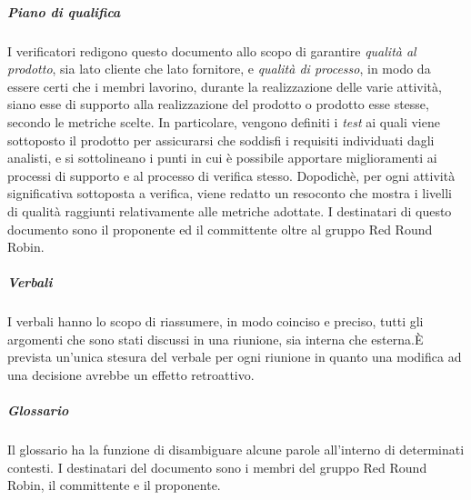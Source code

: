 				\subparagraph{Piano di qualifica}
		 			I verificatori redigono questo documento allo scopo di garantire \textit{qualità al prodotto}, sia lato cliente che lato fornitore, e \textit{qualità di processo}, in modo da essere certi che i membri lavorino, durante la realizzazione delle varie attività, siano esse di supporto alla realizzazione del prodotto o prodotto esse stesse, secondo le metriche scelte. In particolare, vengono definiti i \textit{test} ai quali viene sottoposto il prodotto per assicurarsi che soddisfi i requisiti individuati dagli analisti, e si sottolineano i punti in cui è possibile apportare miglioramenti ai processi di supporto e al processo di verifica stesso. Dopodichè, per ogni attività significativa sottoposta a verifica, viene redatto un resoconto che mostra i livelli di qualità raggiunti relativamente alle metriche adottate. I destinatari di questo documento sono il proponente ed il committente oltre al gruppo Red Round Robin.	
				\subparagraph{Verbali}
					I verbali hanno lo scopo di riassumere, in modo coinciso e preciso, tutti gli argomenti che sono stati discussi in una riunione, sia interna che esterna.È prevista un'unica stesura del verbale per ogni riunione in quanto una modifica ad una decisione avrebbe un effetto retroattivo.
				\subparagraph{Glossario}
				Il glossario ha la funzione di disambiguare alcune parole all'interno di determinati contesti. I destinatari del documento sono i membri del gruppo Red Round Robin, il committente e il proponente.

